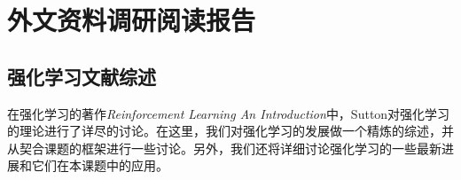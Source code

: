 %


%

%


%
%

\chapter{外文资料调研阅读报告}

\vspace*{5bp}

  \section{强化学习文献综述}
    在强化学习的著作\textit{Reinforcement Learning An Introduction}\cite{Sutton_book}中，Sutton对强化学习的理论进行了详尽的讨论。在这里，我们对强化学习的发展做一个精炼的综述，并从契合课题的框架进行一些讨论。另外，我们还将详细讨论强化学习的一些最新进展和它们在本课题中的应用。
